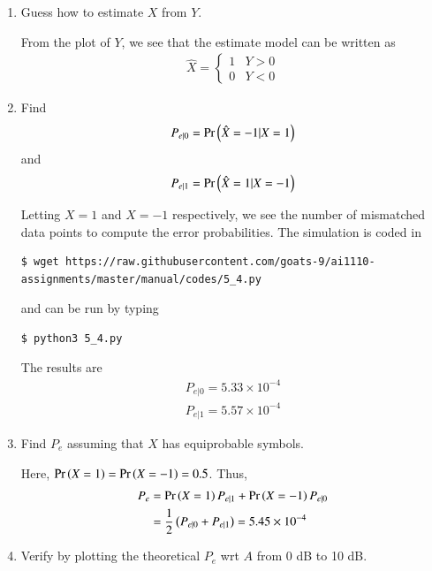 \documentclass[journal,12pt,twocolumn]{IEEEtran}
\renewcommand\thesection{\arabic{section}}
\begin{document}
\begin{enumerate}[label=\thesection.\arabic*
,ref=\thesection.\theenumi]
\item Guess how to estimate $X$ from $Y$.

\solution
From the plot of $Y$, we see that the estimate model can be written as
\begin{align}
	\hat{X} = 
	\begin{cases}
		1 & Y > 0 \\
		0 & Y < 0
	\end{cases}
\end{align}

\item Find 
	\begin{align}
		P_{e|0} = \Pr\left(\hat{X} = -1|X = 1\right)
	\end{align}
and
	\begin{align}
		P_{e|1} = \Pr\left(\hat{X} = 1|X = -1\right)
	\end{align}

\solution
Letting $X = 1$ and $X = -1$ respectively, we see the number of mismatched data points to compute the error probabilities. The simulation is coded in
\begin{lstlisting}
$ wget https://raw.githubusercontent.com/goats-9/ai1110-assignments/master/manual/codes/5_4.py
\end{lstlisting}
and can be run by typing
\begin{lstlisting}
$ python3 5_4.py
\end{lstlisting}
The results are
		\begin{align}
			P_{e|0} = 5.33 \times 10^{-4} \\
			P_{e|1} = 5.57 \times 10^{-4}
		\end{align}
\item Find $P_e$ assuming that $X$ has equiprobable symbols.

\solution
Here, $\Pr\left(X = 1\right) = \Pr\left(X = -1\right) = 0.5$. Thus,
	\begin{align}
		P_e &= \Pr\left(X = 1\right)P_{e|1} + \Pr\left(X = -1\right)P_{e|0} \label{eq:pe-gen} \\
		&= \frac{1}{2}\left(P_{e|0} + P_{e|1}\right) = 5.45 \times 10^{-4}
	\end{align}
\item Verify by plotting the theoretical $P_e$ wrt $A$ from 0 dB to 10 dB.


\end{enumerate}
\end{document}
